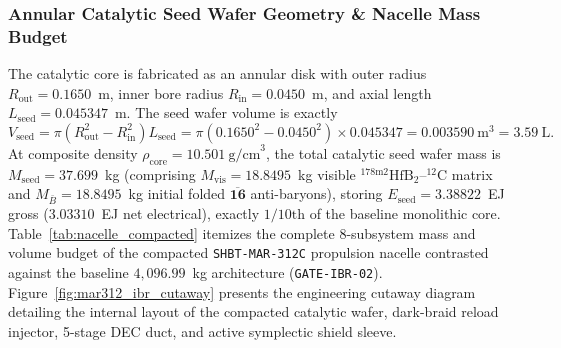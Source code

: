 \documentclass[11pt,onecolumn]{article}
\begin{document}
\subsubsection{Annular Catalytic Seed Wafer Geometry \& Nacelle Mass Budget}
The catalytic core is fabricated as an annular disk with outer radius $R_{\mathrm{out}} = 0.1650$~m, inner bore radius $R_{\mathrm{in}} = 0.0450$~m, and axial length $L_{\mathrm{seed}} = 0.045347$~m. The seed wafer volume is exactly
\begin{equation}
  V_{\mathrm{seed}} = \pi\left(R_{\mathrm{out}}^2 - R_{\mathrm{in}}^2\right)L_{\mathrm{seed}} = \pi\left(0.1650^2 - 0.0450^2\right)\times 0.045347 = 0.003590~\mathrm{m}^3 = 3.59~\mathrm{L}.
  \label{eq:v_seed_comp}
\end{equation}
At composite density $\rho_{\mathrm{core}} = 10.501~\mathrm{g/cm}^3$, the total catalytic seed wafer mass is $M_{\mathrm{seed}} = 37.699$~kg (comprising $M_{\mathrm{vis}} = 18.8495$~kg visible $^{178\mathrm{m2}}\mathrm{HfB}_2\text{--}^{12}\mathrm{C}$ matrix and $M_{\bar B} = 18.8495$~kg initial folded $\overline{\mathbf{16}}$ anti-baryons), storing $E_{\mathrm{seed}} = 3.38822$~EJ gross ($3.03310$~EJ net electrical), exactly $1/10\mathrm{th}$ of the baseline monolithic core. Table~\ref{tab:nacelle_compacted} itemizes the complete 8-subsystem mass and volume budget of the compacted \texttt{SHBT-MAR-312C} propulsion nacelle contrasted against the baseline $4{,}096.99$~kg architecture (\texttt{GATE-IBR-02}). Figure~\ref{fig:mar312_ibr_cutaway} presents the engineering cutaway diagram detailing the internal layout of the compacted catalytic wafer, dark-braid reload injector, 5-stage DEC duct, and active symplectic shield sleeve.
\end{document}
